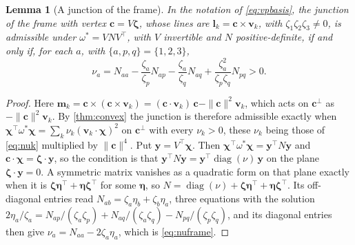 \documentclass[pdflatex,sn-mathphys-num,iicol]{sn-jnl}
\newcommand{\vl}{\mathbf{l}}
\newcommand{\vc}{\mathbf{c}}
\newcommand{\vv}{\mathbf{v}}
\newcommand{\vm}{\mathbf{m}}
\theoremstyle{thmstyleone}
\newtheorem{lemma}[theorem]{Lemma}
\theoremstyle{thmstylethree}
\theoremstyle{thmstyletwo}
\begin{document}
\begin{lemma}[A junction of the frame]\label{lem:frame}
In the notation of \eqref{eq:vpbasis}, the junction of the frame with vertex $\vc=V\boldsymbol\zeta$, whose lines are $\vl_k=\vc\times\vv_k$, with $\zeta_1\zeta_2\zeta_3\neq0$, is admissible under $\omega^{*}=VNV^{\top}$, with $V$ invertible and $N$ positive-definite, if and only if, for each $a$, with $\{a,p,q\}=\{1,2,3\}$,
\begin{equation}
\nu_a=N_{aa}-\frac{\zeta_a}{\zeta_p}N_{ap}-\frac{\zeta_a}{\zeta_q}N_{aq}+\frac{\zeta_a^2}{\zeta_p\zeta_q}N_{pq}>0 .
\label{eq:nuframe}
\end{equation}
\end{lemma}
\begin{proof}
Here $\vm_k=\vc\times(\vc\times\vv_k)=(\vc\cdot\vv_k)\,\vc-\|\vc\|^2\vv_k$, which acts on $\vc^{\perp}$ as $-\|\vc\|^2\vv_k$. By \cref{thm:convex} the junction is therefore admissible exactly when $\boldsymbol\chi^{\top}\omega^{*}\boldsymbol\chi=\sum_k\nu_k(\vv_k\cdot\boldsymbol\chi)^2$ on $\vc^{\perp}$ with every $\nu_k>0$, these $\nu_k$ being those of \eqref{eq:nuk} multiplied by $\|\vc\|^4$. Put $\mathbf y=V^{\top}\boldsymbol\chi$. Then $\boldsymbol\chi^{\top}\omega^{*}\boldsymbol\chi=\mathbf y^{\top}N\mathbf y$ and $\vc\cdot\boldsymbol\chi=\boldsymbol\zeta\cdot\mathbf y$, so the condition is that $\mathbf y^{\top}N\mathbf y=\mathbf y^{\top}\operatorname{diag}(\nu)\,\mathbf y$ on the plane $\boldsymbol\zeta\cdot\mathbf y=0$. A symmetric matrix vanishes as a quadratic form on that plane exactly when it is $\boldsymbol\zeta\boldsymbol\eta^{\top}+\boldsymbol\eta\boldsymbol\zeta^{\top}$ for some $\boldsymbol\eta$, so $N=\operatorname{diag}(\nu)+\boldsymbol\zeta\boldsymbol\eta^{\top}+\boldsymbol\eta\boldsymbol\zeta^{\top}$. Its off-diagonal entries read $N_{ab}=\zeta_a\eta_b+\zeta_b\eta_a$, three equations with the solution $2\eta_a/\zeta_a=N_{ap}/(\zeta_a\zeta_p)+N_{aq}/(\zeta_a\zeta_q)-N_{pq}/(\zeta_p\zeta_q)$, and its diagonal entries then give $\nu_a=N_{aa}-2\zeta_a\eta_a$, which is \eqref{eq:nuframe}.
\end{proof}
\end{document}
